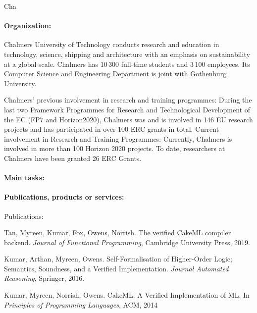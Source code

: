 \begin{sitedescription}{Cha}

\paragraph*{Organization:}

Chalmers University of Technology conducts research and education in
technology, science, shipping and architecture with an emphasis on
sustainability at a global scale. Chalmers has 10\,300 full-time
students and 3\,100 employees.  Its Computer Science and Engineering
Department is joint with Gothenburg University.

Chalmers' previous involvement in research and training programmes:
During the last two Framework Programmes for Research and
Technological Development of the EC (FP7 and Horizon2020), Chalmers
was and is involved in 146 EU research projects and has participated
in over 100 ERC grants in total.  Current involvement in Research and
Training Programmes: Currently, Chalmers is involved in more than 100
Horizon 2020 projects.  To date, researchers at Chalmers have been
granted 26 ERC Grants.


\paragraph*{Main tasks:}

\begin{compactitem}
\item{}
\end{compactitem}

\paragraph*{Publications, products or services:}

Publications:
\begin{compactitem}
\item
  Tan, Myreen, Kumar, Fox, Owens, Norrish.
  The verified CakeML compiler backend.
  \emph{Journal of Functional Programming}, Cambridge University Press, 2019.
\item
  Kumar, Arthan, Myreen, Owens.
  Self-Formalisation of Higher-Order Logic;
  Semantics, Soundness, and a Verified Implementation.
  \emph{Journal Automated Reasoning}, Springer, 2016.
\item
  Kumar, Myreen, Norrish, Owens.
  CakeML: A Verified Implementation of ML.
  In \emph{Principles of Programming Languages}, ACM, 2014
\end{compactitem}


\end{sitedescription}
